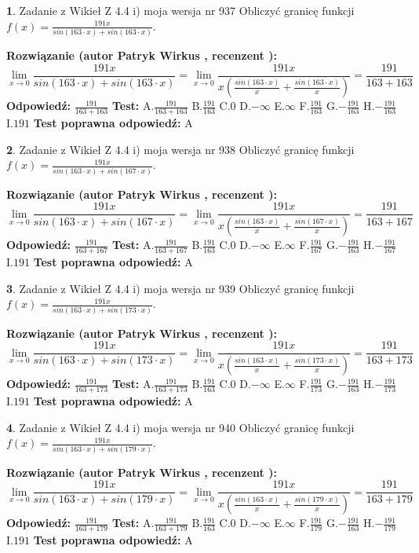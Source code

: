 \documentclass[12pt, a4paper]{article}
\theoremstyle{definition} %
\newtheorem{zad}{}
\newcommand{\zadStart}[1]{\begin{zad}#1\newline}
\newcommand{\zadStop}{\end{zad}}
\newcommand{\rozwStart}[2]{\noindent \textbf{Rozwiązanie (autor #1 , recenzent #2): }\newline}
\newcommand{\rozwStop}{\newline}
\newcommand{\odpStart}{\noindent \textbf{Odpowiedź:}\newline}
\newcommand{\odpStop}{\newline}
\newcommand{\testStart}{\noindent \textbf{Test:}\newline}
\newcommand{\testStop}{\newline}
\newcommand{\kluczStart}{\noindent \textbf{Test poprawna odpowiedź:}\newline}
\newcommand{\kluczStop}{\newline}
\begin{document}
\zadStart{Zadanie z Wikieł Z 4.4 i) moja wersja nr 937}
Obliczyć granicę funkcji $f(x)=\frac{191x}{sin(163\cdot x) +sin(163\cdot x)}$.
\zadStop
\rozwStart{Patryk Wirkus}{}
$$\lim\limits_{x\to 0}\frac{191x}{sin(163\cdot x) +sin(163\cdot x)}=\lim\limits_{x\to 0}\frac{191x}{x(\frac{sin(163\cdot x)}{x}+\frac{sin(163\cdot x)}{x})}=\frac{191}{163+163}$$
\rozwStop
\odpStart
$\frac{191}{163+163}$
\odpStop
\testStart
A.$\frac{191}{163+163}$
B.$\frac{191}{163}$
C.$0$
D.$-\infty$
E.$\infty$
F.$\frac{191}{163}$
G.$-\frac{191}{163}$
H.$-\frac{191}{163}$
I.$191$
\testStop
\kluczStart
A
\kluczStop



\zadStart{Zadanie z Wikieł Z 4.4 i) moja wersja nr 938}
Obliczyć granicę funkcji $f(x)=\frac{191x}{sin(163\cdot x) +sin(167\cdot x)}$.
\zadStop
\rozwStart{Patryk Wirkus}{}
$$\lim\limits_{x\to 0}\frac{191x}{sin(163\cdot x) +sin(167\cdot x)}=\lim\limits_{x\to 0}\frac{191x}{x(\frac{sin(163\cdot x)}{x}+\frac{sin(167\cdot x)}{x})}=\frac{191}{163+167}$$
\rozwStop
\odpStart
$\frac{191}{163+167}$
\odpStop
\testStart
A.$\frac{191}{163+167}$
B.$\frac{191}{163}$
C.$0$
D.$-\infty$
E.$\infty$
F.$\frac{191}{167}$
G.$-\frac{191}{163}$
H.$-\frac{191}{167}$
I.$191$
\testStop
\kluczStart
A
\kluczStop



\zadStart{Zadanie z Wikieł Z 4.4 i) moja wersja nr 939}
Obliczyć granicę funkcji $f(x)=\frac{191x}{sin(163\cdot x) +sin(173\cdot x)}$.
\zadStop
\rozwStart{Patryk Wirkus}{}
$$\lim\limits_{x\to 0}\frac{191x}{sin(163\cdot x) +sin(173\cdot x)}=\lim\limits_{x\to 0}\frac{191x}{x(\frac{sin(163\cdot x)}{x}+\frac{sin(173\cdot x)}{x})}=\frac{191}{163+173}$$
\rozwStop
\odpStart
$\frac{191}{163+173}$
\odpStop
\testStart
A.$\frac{191}{163+173}$
B.$\frac{191}{163}$
C.$0$
D.$-\infty$
E.$\infty$
F.$\frac{191}{173}$
G.$-\frac{191}{163}$
H.$-\frac{191}{173}$
I.$191$
\testStop
\kluczStart
A
\kluczStop



\zadStart{Zadanie z Wikieł Z 4.4 i) moja wersja nr 940}
Obliczyć granicę funkcji $f(x)=\frac{191x}{sin(163\cdot x) +sin(179\cdot x)}$.
\zadStop
\rozwStart{Patryk Wirkus}{}
$$\lim\limits_{x\to 0}\frac{191x}{sin(163\cdot x) +sin(179\cdot x)}=\lim\limits_{x\to 0}\frac{191x}{x(\frac{sin(163\cdot x)}{x}+\frac{sin(179\cdot x)}{x})}=\frac{191}{163+179}$$
\rozwStop
\odpStart
$\frac{191}{163+179}$
\odpStop
\testStart
A.$\frac{191}{163+179}$
B.$\frac{191}{163}$
C.$0$
D.$-\infty$
E.$\infty$
F.$\frac{191}{179}$
G.$-\frac{191}{163}$
H.$-\frac{191}{179}$
I.$191$
\testStop
\kluczStart
A
\kluczStop
\end{document}
